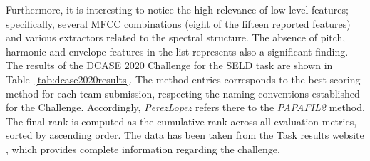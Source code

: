 Furthermore, it is interesting to notice the high relevance of low-level features; specifically, several MFCC combinations (eight of the fifteen reported features) and various extractors related to the spectral structure. The absence of pitch, harmonic and envelope features in the list represents also a significant finding. \\



The results of the DCASE 2020 Challenge for the SELD task are shown in Table~\ref{tab:dcase2020results}. The method entries corresponds to the best scoring method for each team submission, respecting the naming conventions established for the Challenge. Accordingly, \textit{PerezLopez} refers there to the \textit{PAPAFIL2} method. 
The final rank is computed as the cumulative rank across all evaluation metrics, sorted by ascending order. The data has been taken from the Task results website \cite{dcasetask}, which provides complete information regarding the challenge.


